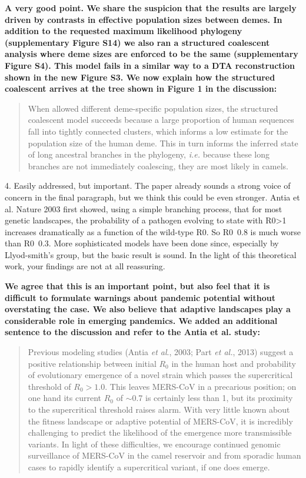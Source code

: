 \documentclass[11pt,oneside,letterpaper]{article}
\begin{document}
\textbf{A very good point. We share the suspicion that the results are largely driven by contrasts in effective population sizes between demes. In addition to the requested maximum likelihood phylogeny (supplementary Figure S14) we also ran a structured coalescent analysis where deme sizes are enforced to be the same (supplementary Figure S4). This model fails in a similar way to a DTA reconstruction shown in the new Figure S3. We now explain how the structured coalescent arrives at the tree shown in Figure 1 in the discussion:}

\begin{quotation}
When allowed different deme-specific population sizes, the structured coalescent model succeeds because a large proportion of human sequences fall into tightly connected clusters, which informs a low estimate for the population size of the human deme. 
This in turn informs the inferred state of long ancestral branches in the phylogeny, \textit{i.e.} because these long branches are not immediately coalescing, they are most likely in camels.
\end{quotation}

4. Easily addressed, but important. The paper already sounds a strong voice of concern in the final paragraph, but we think this could be even stronger. Antia et al. Nature 2003 first showed, using a simple branching process, that for most genetic landscapes, the probability of a pathogen evolving to state with R0>1 increases dramatically as a function of the wild-type R0. So R0~0.8 is much worse than R0~0.3. More sophisticated models have been done since, especially by Llyod-smith's group, but the basic result is sound. In the light of this theoretical work, your findings are not at all reassuring.

\textbf{We agree that this is an important point, but also feel that it is difficult to formulate warnings about pandemic potential without overstating the case. We also believe that adaptive landscapes play a considerable role in emerging pandemics. We added an additional sentence to the discussion and refer to the Antia et al. study:}

\begin{quotation}
Previous modeling studies (Antia \textit{et al}., 2003; Part \textit{et al.}, 2013) suggest a positive relationship between initial $R_{0}$ in the human host and probability of evolutionary emergence of a novel strain which passes the supercritical threshold of $R_{0}>1.0$.
This leaves MERS-CoV in a precarious position; on one hand its current $R_{0}$ of $\sim$0.7 is certainly less than 1, but its proximity to the supercritical threshold raises alarm.
With very little known about the fitness landscape or adaptive potential of MERS-CoV, it is incredibly challenging to predict the likelihood of the emergence more transmissible variants.
In light of these difficulties, we encourage continued genomic surveillance of MERS-CoV in the camel reservoir and from sporadic human cases to rapidly identify a supercritical variant, if one does emerge.
\end{quotation}
\end{document}
